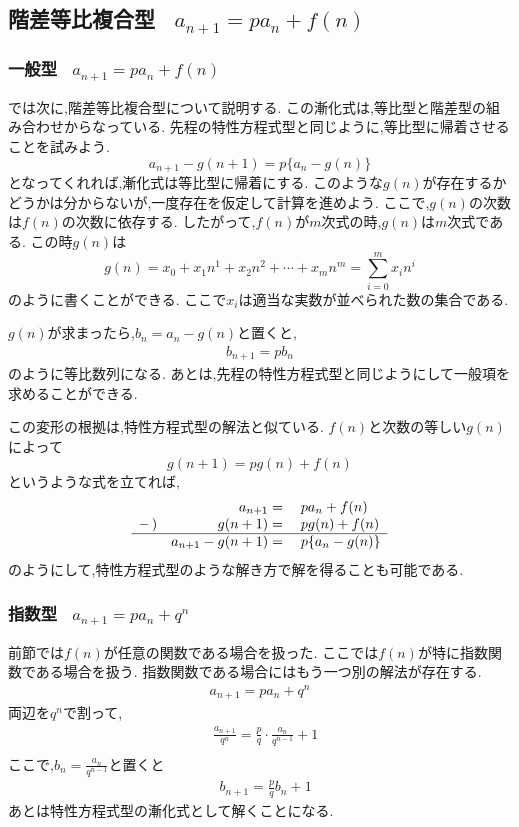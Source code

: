 
\subsection{\texorpdfstring{階差等比複合型 \, $\displaystyle a_{n+1}=pa_n+f(n)$}{階差等比複合型}}\label{節：階差等比複合型}
  \subsubsection{\texorpdfstring{一般型 \, $\displaystyle a_{n+1}=pa_n+f(n)$}{一般型}}
    では次に,階差等比複合型について説明する.
    この漸化式は,等比型と階差型の組み合わせからなっている.
    先程の特性方程式型と同じように,等比型に帰着させることを試みよう.
    \[
      a_{n+1}-g(n+1)=p\{a_n-g(n)\}
    \]
    となってくれれば,漸化式は等比型に帰着にする.
    このような$g(n)$が存在するかどうかは分からないが,一度存在を仮定して計算を進めよう.
    ここで,$g(n)$の次数は$f(n)$の次数に依存する.
    したがって,$f(n)$が$m$次式の時,$g(n)$は$m$次式である.
    この時$g(n)$は
    \[
      g(n) = x_0 + x_1 n^1 + x_2 n^2  + \cdots +x_{m} n^m =\sum_{i=0}^{m} x_i n^{i}
    \]
    のように書くことができる.
    ここで$x_i$は適当な実数が並べられた数の集合である.

    $g(n)$が求まったら,$b_n=a_n-g(n)$と置くと,
    \begin{align*}
      b_{n+1}=pb_n
    \end{align*}
    のように等比数列になる.
    あとは,先程の特性方程式型と同じようにして一般項を求めることができる.

    この変形の根拠は,特性方程式型の解法と似ている.
    $f(n)$と次数の等しい$g(n)$によって
    \[
      g(n+1)=pg(n)+f(n)
    \]
    というような式を立てれば,
    \[
      \begin{array}{rrl}
        & a_{n+1}={} & pa_n+f(n)\\
        -\,) & g(n+1)={} & pg(n)+f(n)\\ \hline
        & a_{n+1}-g(n+1)={} & p\{a_n-g(n)\}
      \end{array}
    \]
    のようにして,特性方程式型のような解き方で解を得ることも可能である.
  \subsubsection{\texorpdfstring{指数型  \, $\displaystyle a_{n+1}=pa_n+q^n$}{指数型}}
    前節では$f(n)$が任意の関数である場合を扱った.
    ここでは$f(n)$が特に指数関数である場合を扱う.
    指数関数である場合にはもう一つ別の解法が存在する.
    \begin{align*}
      a_{n+1}=pa_n+q^n
    \end{align*}
    両辺を$q^n$で割って,
    \begin{align*}      
      &\frac{a_{n+1}}{q^n}=\frac{p}{q}\cdot\frac{a_n}{q^{n-1}}+1\\
    \end{align*}
    ここで,$b_n=\frac{a_n}{q^{n-1}}$と置くと
    \begin{align*}
      &b_{n+1}=\frac{p}{q}b_n+1
    \end{align*}
    あとは特性方程式型の漸化式として解くことになる.
